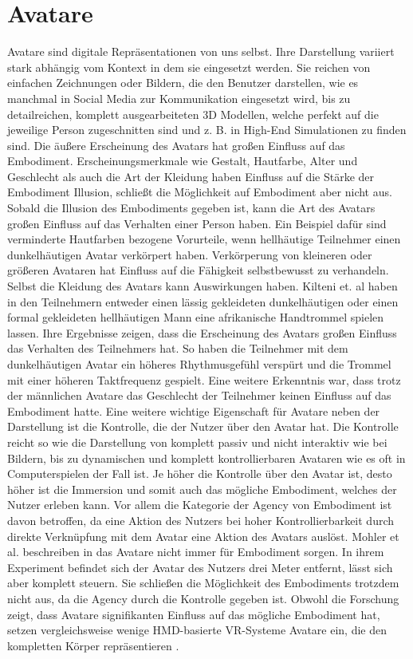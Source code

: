 \section{Avatare}
Avatare sind digitale Repräsentationen von uns selbst. Ihre Darstellung variiert stark abhängig vom Kontext in dem sie eingesetzt werden. Sie reichen von einfachen Zeichnungen oder Bildern, die den Benutzer darstellen, wie es manchmal in Social Media zur Kommunikation eingesetzt wird, bis zu detailreichen, komplett ausgearbeiteten 3D Modellen, welche perfekt auf die jeweilige Person zugeschnitten sind und z. B. in High-End Simulationen zu finden sind.
Die äußere Erscheinung des Avatars hat großen Einfluss auf das Embodiment. Erscheinungsmerkmale wie Gestalt, Hautfarbe, Alter und Geschlecht als auch die Art der Kleidung haben Einfluss auf die Stärke der Embodiment Illusion, schließt die Möglichkeit auf Embodiment aber nicht aus. Sobald die Illusion des Embodiments gegeben ist, kann die Art des Avatars großen Einfluss auf das Verhalten einer Person haben. Ein Beispiel dafür sind verminderte Hautfarben bezogene Vorurteile, wenn hellhäutige Teilnehmer einen dunkelhäutigen Avatar verkörpert haben. Verkörperung von kleineren oder größeren Avataren hat Einfluss auf die Fähigkeit selbstbewusst zu verhandeln. Selbst die Kleidung des Avatars kann Auswirkungen haben. Kilteni et. al haben in\cite{Kilteni2013} den Teilnehmern entweder einen lässig gekleideten dunkelhäutigen oder einen formal gekleideten hellhäutigen Mann eine afrikanische Handtrommel spielen lassen. Ihre Ergebnisse zeigen, dass die Erscheinung des Avatars großen Einfluss das Verhalten des Teilnehmers hat. So haben die Teilnehmer mit dem dunkelhäutigen Avatar ein höheres Rhythmusgefühl verspürt und die Trommel mit einer höheren Taktfrequenz gespielt. Eine weitere Erkenntnis war, dass trotz der männlichen Avatare das Geschlecht der Teilnehmer keinen Einfluss auf das Embodiment hatte.
Eine weitere wichtige Eigenschaft für Avatare neben der Darstellung ist die Kontrolle, die der Nutzer über den Avatar hat. Die Kontrolle reicht so wie die Darstellung von komplett passiv und nicht interaktiv wie bei Bildern, bis zu dynamischen und komplett kontrollierbaren Avataren wie es oft in Computerspielen der Fall ist. Je höher die Kontrolle über den Avatar ist, desto höher ist die Immersion und somit auch das mögliche Embodiment, welches der Nutzer erleben kann. Vor allem die Kategorie der Agency von Embodiment ist davon betroffen, da eine Aktion des Nutzers bei hoher Kontrollierbarkeit durch direkte Verknüpfung mit dem Avatar eine Aktion des Avatars auslöst.\cite{Biocca2014} Mohler et al. beschreiben in \cite{Mohler2010} das Avatare nicht immer für Embodiment sorgen. In ihrem Experiment befindet sich der Avatar des Nutzers drei Meter entfernt, lässt sich aber komplett steuern. Sie schließen die Möglichkeit des Embodiments trotzdem nicht aus, da die Agency durch die Kontrolle gegeben ist.
Obwohl die Forschung zeigt, dass Avatare signifikanten Einfluss auf das mögliche Embodiment hat, setzen vergleichsweise wenige HMD-basierte VR-Systeme Avatare ein, die den kompletten Körper repräsentieren \cite{Pan2017}.

